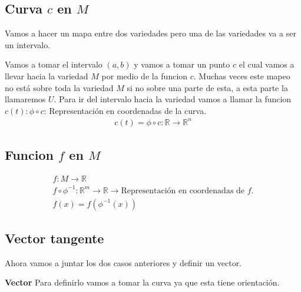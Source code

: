 \documentclass{article}
\begin{document}
\subsection{Curva $ c  $ en $ M  $}
Vamos a hacer un mapa entre dos variedades pero una de las variedades va a ser un intervalo. 

Vamos a tomar el intervalo $ (a,b) $ y vamos a tomar un punto $ c  $ el cual vamos a llevar hacia la variedad $ M  $ por medio de la funcion $ c  $. Muchas veces este mapeo no está sobre toda la variedad $ M  $ si no sobre una parte de esta, a esta parte la llamaremos $ U  $. Para ir del intervalo hacia la variedad vamos a llamar la funcion $ c(t): \phi \circ c  $: Representación en coordenadas de la curva. 
\begin{gather*}
  c(t) = \phi \circ c : \mathbb{R} \rightarrow \mathbb{R}^ {n } 
\end{gather*}

\subsection{Funcion $ f  $ en $ M  $}
\begin{gather*}
  f: M \rightarrow \mathbb{R}\\
  f \circ \phi ^ {-1 }: \mathbb{R}^m \rightarrow \mathbb{R} \rightarrow \text{Representación en coordenadas de }f.\\
  f(x) = f(\phi ^ {-1 }(x))
\end{gather*}

\subsection{Vector tangente }
Ahora vamos a juntar los dos casos anteriores y definir un vector.

\textbf{Vector} Para definirlo vamos a tomar la curva ya que esta tiene orientación. 
\end{document}
